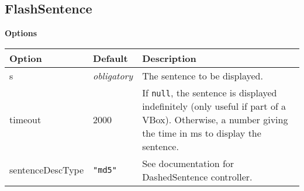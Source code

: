 \documentclass[
]{article}
\begin{document}
\hypertarget{flashsentence}{%
\subsection{FlashSentence}\label{flashsentence}}

\textbf{Options}

\begin{RaggedRight}\small\begin{longtable}[]{p{1.7in}p{1in}p{3.15in}}
\toprule
\begin{minipage}[b]{0.18\columnwidth}\raggedright
\textbf{Option}\strut
\end{minipage} & \begin{minipage}[b]{0.24\columnwidth}\raggedright
\textbf{Default}\strut
\end{minipage} & \begin{minipage}[b]{0.49\columnwidth}\raggedright
\textbf{Description}\strut
\end{minipage}\tabularnewline
\midrule
\endhead
\begin{minipage}[t]{0.18\columnwidth}\raggedright
s\strut
\end{minipage} & \begin{minipage}[t]{0.24\columnwidth}\raggedright
\emph{obligatory}\strut
\end{minipage} & \begin{minipage}[t]{0.49\columnwidth}\raggedright
The sentence to be displayed.\strut
\end{minipage}\tabularnewline
\begin{minipage}[t]{0.18\columnwidth}\raggedright
timeout\strut
\end{minipage} & \begin{minipage}[t]{0.24\columnwidth}\raggedright
2000\strut
\end{minipage} & \begin{minipage}[t]{0.49\columnwidth}\raggedright
If \texttt{null}, the sentence is displayed indefinitely (only useful if
part of a VBox). Otherwise, a number giving the time in ms to display
the sentence.\strut
\end{minipage}\tabularnewline
\begin{minipage}[t]{0.18\columnwidth}\raggedright
sentenceDescType\strut
\end{minipage} & \begin{minipage}[t]{0.24\columnwidth}\raggedright
\texttt{"md5"}\strut
\end{minipage} & \begin{minipage}[t]{0.49\columnwidth}\raggedright
See documentation for DashedSentence controller.\strut
\end{minipage}\tabularnewline
\bottomrule
\end{longtable}\normalsize\end{RaggedRight}
\end{document}
